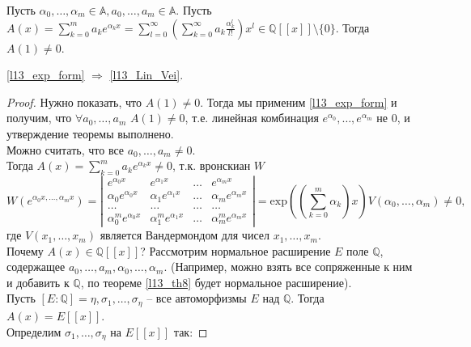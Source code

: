 \begin{theorem} \label{l13_exp_form}
	Пусть $\alpha_0, \ldots, \alpha_m \in \mathbb{A}, a_0, \ldots, a_m \in \mathbb{A}$. Пусть $\displaystyle A(x) = \sum_{k = 0}^{m} a_k e^{\alpha_k x} = \sum_{l = 0}^{\infty} \left( \sum_{k = 0}^{\infty} a_k \frac{\alpha_k^l}{l!} \right)x^l \in \mathbb{Q}[[x]] \setminus \lbrace 0 \rbrace$. 
	Тогда $A(1) \ne 0$.
\end{theorem}

\begin{theorem} \label{l13_th10}
	\ref{l13_exp_form} $\Rightarrow$ \ref{l13_Lin_Vei}.
\end{theorem}
\begin{proof}
	Нужно показать, что $A(1) \ne 0$. Тогда мы применим \ref{l13_exp_form} и получим, что $\forall a_0, \ldots, a_m$ $A(1) \ne 0$, т.е. линейная комбинация $e^{\alpha_0}, \ldots, e^{\alpha_m}$ не 0, и утверждение теоремы выполнено.\\
	Можно считать, что все $a_0, \ldots, a_m \ne 0$.\\
	Тогда $\displaystyle A(x) = \sum_{k = 0}^{m} a_k e^{\alpha_k x} \ne 0$, т.к. вронскиан $W$\\
 	\[ W(e^{\alpha_0 x, \ldots, \alpha_m x}) = \left| 
 	\begin{array}{cccc}
		e^{\alpha_0 x}       & e^{\alpha_1 x}   & \ldots & e^{\alpha_m x}  \\
    	\alpha_0 e^{\alpha_0 x}       & \alpha_1 e^{\alpha_1 x}   & \ldots & \alpha_m e^{\alpha_m x} \\
    	\ldots & \ldots & \ldots & \ldots \\
    	\alpha_0^m e^{\alpha_0 x}       & \alpha_1^m e^{\alpha_1 x}   & \ldots & \alpha_m^m e^{\alpha_m x}
    \end{array} \right|  = \mathrm{exp}\left(\left(\sum_{k=0}^{m} \alpha_k\right)x\right)  V(\alpha_0, \ldots, \alpha_m) \ne 0,\] 
    где $V(x_1, \ldots, x_m)$ является Вандермондом для чисел $x_1, \ldots, x_m$.\\
    Почему $A(x) \in \mathbb{Q}[[x]]$? Рассмотрим нормальное расширение $E$ поле $\mathbb{Q}$, содержащее $a_0, \ldots, a_m, \alpha_0, \ldots, \alpha_m$. (Например, можно взять все сопряженные к ним и добавить к $\mathbb{Q}$, по теореме \ref{l13_th8} будет нормальное расширение).\\
    Пусть $[E : \mathbb{Q}] = \eta, \sigma_1, \ldots, \sigma_{\eta}$ -- все автоморфизмы $E$ над $\mathbb{Q}$. Тогда $A(x) = E[[x]]$.\\
    Определим $\sigma_1, \ldots, \sigma_{\eta}$ на $E[[x]]$ так:

\end{proof}

